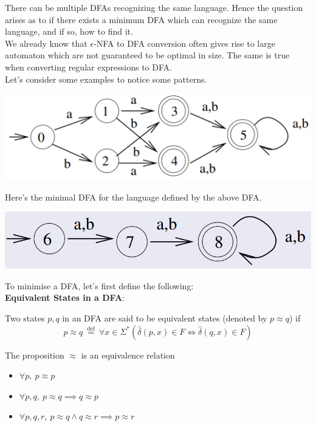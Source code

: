 \documentclass{report}
\begin{document}
There can be multiple DFAs recognizing the same language. Hence the question arises as to if there exists a minimum DFA which can recognize the same language, and if so, how to find it. \\

We already know that $\epsilon$-NFA to DFA conversion often gives rise to large automaton which are not guaranteed to be optimal in size. The same is true when converting regular expressions to DFA. \\

Let's consider some examples to notice some patterns.

\begin{center}
  \includegraphics[scale=0.5]{images/large-auto-1.png}
\end{center}

Here's the minimal DFA for the language defined by the above DFA.

\begin{center}
  \includegraphics[scale=0.5]{images/minimised-auto-1.png}
\end{center}

To minimise a DFA, let's first define the following: \\

\textbf{Equivalent States in a DFA}:

Two states $p,q$ in an DFA are said to be equivalent states (denoted by $p\approx q$) if
$$ p\approx q \ \overset{\text{def}}{=} \ \forall x \in \Sigma^* (\hat{\delta}(p,x) \in F \iff \hat{\delta}(q,x) \in F)$$

The proposition $\approx$ is an equivalence relation
\begin{itemize}
  \item $\forall p, \ p \approx p$
  \item $\forall p,q, \ p \approx q \implies q \approx p $
  \item $\forall p,q,r, \ p \approx q \land q \approx r \implies p \approx r$
\end{itemize}
\end{document}
